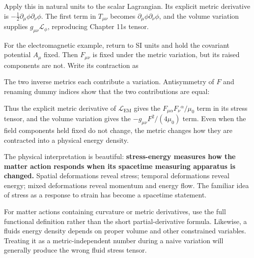 \documentclass[
  11pt,
  letterpaper,
  oneside,
  openany]{scrbook}
\begin{document}
Apply this in natural units to the scalar Lagrangian. Its explicit
metric derivative is \(-\frac12\partial_\mu\phi\partial_\nu\phi\). The
first term in \(T_{\mu\nu}\) becomes
\(\partial_\mu\phi\partial_\nu\phi\), and the volume variation supplies
\(g_{\mu\nu}\mathcal L_\phi\), reproducing Chapter 11\textquotesingle s
tensor.

For the electromagnetic example, return to SI units and hold the
covariant potential \(A_\mu\) fixed. Then \(F_{\mu\nu}\) is fixed under
the metric variation, but its raised components are not. Write its
contraction as

\begin{center}
\begingroup
{}
\ifdim\wd\grmathbox>\linewidth
\resizebox{\linewidth}{!}{\usebox{\grmathbox}}
\else\usebox{\grmathbox}\fi
\endgroup
\end{center}

The two inverse metrics each contribute a variation. Antisymmetry of
\(F\) and renaming dummy indices show that the two contributions are
equal:

\begin{center}
\begingroup
{}
\ifdim\wd\grmathbox>\linewidth
\resizebox{\linewidth}{!}{\usebox{\grmathbox}}
\else\usebox{\grmathbox}\fi
\endgroup
\end{center}

Thus the explicit metric derivative of \(\mathcal L_{\mathrm{EM}}\)
gives the \(F_{\mu\alpha}F_\nu{}^\alpha/\mu_0\) term in its stress
tensor, and the volume variation gives the \(-g_{\mu\nu}F^2/(4\mu_0)\)
term. Even when the field components held fixed do not change, the
metric changes how they are contracted into a physical energy density.

The physical interpretation is beautiful: \textbf{stress-energy measures
how the matter action responds when its spacetime measuring apparatus is
changed.} Spatial deformations reveal stress; temporal deformations
reveal energy; mixed deformations reveal momentum and energy flow. The
familiar idea of stress as a response to strain has become a spacetime
statement.

For matter actions containing curvature or metric derivatives, use the
full functional definition rather than the short partial-derivative
formula. Likewise, a fluid\textquotesingle s energy density depends on
proper volume and other constrained variables. Treating it as a
metric-independent number during a naive variation will generally
produce the wrong fluid stress tensor.
\end{document}
